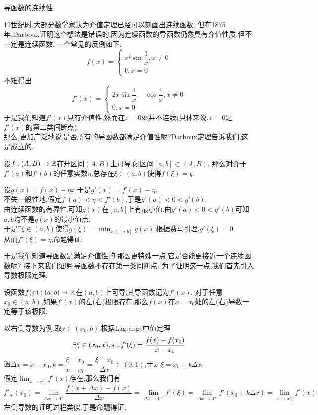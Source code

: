 \documentclass{ctexart}
\begin{document}
\pagestyle{empty}
\begin{center}\large 导函数的连续性\end{center}
19世纪时,大部分数学家认为介值定理已经可以刻画出连续函数.
但在1875年,Darboux证明这个想法是错误的,因为连续函数的导函数仍然具有介值性质,但不一定是连续函数.
一个常见的反例如下:
$$f(x)=\left\{\begin{array}{l}
    x^2\sin\dfrac{1}{x},x\neq 0\\
    0,x=0
\end{array}\right.$$
不难得出
$$f'(x)=\left\{\begin{array}{l}
    2x\sin\dfrac{1}{x}-\cos\dfrac{1}{x},x\neq 0\\
    0,x=0
\end{array}\right.$$
于是我们知道$f'(x)$具有介值性,然而在$x=0$处并不连续(具体来说,$x=0$是$f'(x)$的第二类间断点).\\
那么,更加广泛地说,是否所有的导函数都满足介值性呢?Darboux定理告诉我们,这是成立的.
\begin{formal}
    设$f:(A,B)\to\mathbb{R}$在开区间$(A,B)$上可导,闭区间$[a,b]\subset(A,B)$.
    那么对介于$f'(a)$和$f'(b)$的任意实数$\eta$,总存在$\xi\in(a,b)$使得$f(\xi)=\eta$.
\end{formal}
\begin{solution}[Proof.]
    设$g(x)=f(x)-\eta x$,于是$g'(x)=f'(x)-\eta$.\\
    不失一般性地,假定$f'(a)<\eta<f'(b)$,于是$g'(a)<0<g'(b)$.\\
    由连续函数的有界性,可知$g(x)$在$[a,b]$上有最小值.由$g'(a)<0<g'(b)$可知$a,b$均不是$g(x)$的最小值点.\\
    于是$\exists\xi\in(a,b)$使得$\displaystyle g(\xi)=\min_{x\in[a,b]}g(x)$.根据费马引理,$g'(\xi)=0$.\\
    从而$f'(\xi)=\eta$,命题得证.
\end{solution}\noindent
于是我们知道导函数是满足介值性的.那么更特殊一点,它是否能更接近一个连续函数呢?
接下来我们证明:导函数不存在第一类间断点.
为了证明这一点,我们首先引入导数极限定理.
\begin{formal}[导数极限定理]
    设函数$f(x):(a,b)\to\mathbb{R}$在$(a,b)$上可导,其导函数记为$f'(x)$.
    对于任意$x_0\in(a,b)$,如果$f'(x)$的左(右)极限存在,那么$f(x)$在$x=x_0$处的左(右)导数一定等于该极限.
\end{formal}
\begin{solution}[Proof.]
    以右侧导数为例.取$x\in(x_0,b)$,根据Lagrange中值定理
    $$\exists\xi\in(x_0,x),\text{s.t.} f'(\xi)=\dfrac{f(x)-f(x_0)}{x-x_0}$$
    置$\Delta x=x-x_0,k=\dfrac{\xi-x_0}{x-x_0}=\dfrac{\xi-x_0}{\Delta x}\in(0,1)$,于是$\xi=x_0+k\Delta x$.\\
    假定$\displaystyle\lim_{x\to x_0^+}f'(x)$存在,那么我们有
    $$f'_+(x_0)=\lim_{\Delta x\to 0^+}\dfrac{f(x+\Delta x)-f(x)}{\Delta x}=\lim_{\Delta x\to 0^+}f'(\xi)=\lim_{\Delta x\to 0^+}f'(x_0+k\Delta x)=\lim_{x\to x_0^+}f'(x)$$
    左侧导数的证明过程类似.于是命题得证.
\end{solution}\noindent
\end{document}
